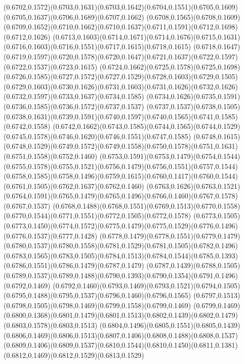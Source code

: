 (0.6702,0.1572)(0.6703,0.1631)(0.6703,0.1642)(0.6704,0.1551)(0.6705,0.1609)(0.6705,0.1637)(0.6706,0.1689)(0.6707,0.1662)
(0.6708,0.1565)(0.6708,0.1609)(0.6709,0.1652)(0.6710,0.1662)(0.6710,0.1637)(0.6711,0.1591)(0.6712,0.1698)(0.6712,0.1626)
(0.6713,0.1603)(0.6714,0.1671)(0.6714,0.1676)(0.6715,0.1631)(0.6716,0.1603)(0.6716,0.1551)(0.6717,0.1615)(0.6718,0.1615)
(0.6718,0.1647)(0.6719,0.1597)(0.6720,0.1578)(0.6720,0.1647)(0.6721,0.1637)(0.6722,0.1597)(0.6722,0.1537)(0.6723,0.1615)
(0.6724,0.1662)(0.6725,0.1578)(0.6725,0.1698)(0.6726,0.1585)(0.6727,0.1572)(0.6727,0.1529)(0.6728,0.1603)(0.6729,0.1505)
(0.6729,0.1603)(0.6730,0.1626)(0.6731,0.1603)(0.6731,0.1626)(0.6732,0.1626)(0.6732,0.1597)(0.6733,0.1637)(0.6734,0.1585)
(0.6734,0.1626)(0.6735,0.1591)(0.6736,0.1585)(0.6736,0.1572)(0.6737,0.1537)
\PST@Solid(0.6737,0.1537)(0.6738,0.1505)(0.6738,0.1631)(0.6739,0.1591)(0.6740,0.1597)(0.6740,0.1565)(0.6741,0.1585)(0.6742,0.1558)
(0.6742,0.1662)(0.6743,0.1585)(0.6744,0.1565)(0.6744,0.1529)(0.6745,0.1578)(0.6746,0.1620)(0.6746,0.1551)(0.6747,0.1585)
(0.6748,0.1615)(0.6748,0.1529)(0.6749,0.1572)(0.6749,0.1558)(0.6750,0.1578)(0.6751,0.1631)(0.6751,0.1558)(0.6752,0.1460)
(0.6753,0.1591)(0.6753,0.1479)(0.6754,0.1544)(0.6755,0.1578)(0.6755,0.1521)(0.6756,0.1479)(0.6756,0.1551)(0.6757,0.1544)
(0.6758,0.1585)(0.6758,0.1496)(0.6759,0.1615)(0.6760,0.1417)(0.6760,0.1544)(0.6761,0.1505)(0.6762,0.1637)(0.6762,0.1460)
(0.6763,0.1626)(0.6763,0.1521)(0.6764,0.1591)(0.6765,0.1479)(0.6765,0.1496)(0.6766,0.1460)(0.6767,0.1578)(0.6767,0.1537)
(0.6768,0.1488)(0.6768,0.1551)(0.6769,0.1513)(0.6770,0.1558)(0.6770,0.1544)(0.6771,0.1551)(0.6772,0.1505)(0.6772,0.1578)
(0.6773,0.1505)(0.6773,0.1450)(0.6774,0.1572)(0.6775,0.1479)(0.6775,0.1529)(0.6776,0.1496)(0.6776,0.1537)(0.6777,0.1428)
(0.6778,0.1479)(0.6778,0.1551)(0.6779,0.1479)(0.6780,0.1537)(0.6780,0.1558)(0.6781,0.1529)(0.6781,0.1505)(0.6782,0.1496)
(0.6783,0.1565)(0.6783,0.1505)(0.6784,0.1513)(0.6784,0.1544)(0.6785,0.1393)(0.6786,0.1551)(0.6786,0.1479)(0.6787,0.1479)
(0.6787,0.1439)(0.6788,0.1505)(0.6789,0.1537)(0.6789,0.1488)(0.6790,0.1393)(0.6790,0.1354)(0.6791,0.1496)(0.6792,0.1469)
(0.6792,0.1460)(0.6793,0.1469)(0.6793,0.1521)(0.6794,0.1505)(0.6795,0.1488)(0.6795,0.1537)(0.6796,0.1460)(0.6796,0.1565)
(0.6797,0.1513)(0.6798,0.1505)(0.6798,0.1469)(0.6799,0.1558)(0.6799,0.1469)
\PST@Solid(0.6799,0.1469)(0.6800,0.1368)(0.6801,0.1479)(0.6801,0.1513)(0.6802,0.1439)(0.6802,0.1479)(0.6803,0.1578)(0.6803,0.1513)
(0.6804,0.1496)(0.6805,0.1551)(0.6805,0.1439)(0.6806,0.1469)(0.6806,0.1513)(0.6807,0.1406)(0.6808,0.1488)(0.6808,0.1537)
(0.6809,0.1406)(0.6809,0.1537)(0.6810,0.1544)(0.6810,0.1450)(0.6811,0.1381)(0.6812,0.1469)(0.6812,0.1529)(0.6813,0.1529)
